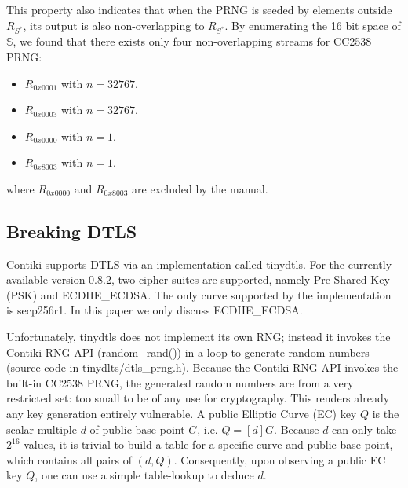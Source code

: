 This property also indicates that when the PRNG is seeded by elements outside $R_{S^*}$, its output is also non-overlapping to $R_{S^*}$. By enumerating the 16 bit space of $\mathbb{S}$, we found that there exists only four non-overlapping streams for CC2538 PRNG:
\begin{itemize}
	\item $R_{0x0001}$ with $n = 32767$.
	\item $R_{0x0003}$ with $n = 32767$.
	\item $R_{0x0000}$ with $n = 1$.
	\item $R_{0x8003}$ with $n = 1$.
\end{itemize}
where $R_{0x0000}$ and $R_{0x8003}$ are excluded by the manual\cite{CC2538Manual}. 

\subsection{Breaking DTLS} \label{BreakDTLS}
Contiki supports DTLS via an implementation called tinydtls\cite{tinydtls}. For the currently available version 0.8.2\cite{tinydtls082},  two cipher suites are supported, namely Pre-Shared Key (PSK)\cite{rfc4279} and ECDHE\_ECDSA\cite{rfc4492}. The only curve supported by the implementation is secp256r1\cite{secp256r1}. In this paper we only discuss ECDHE\_ECDSA. 


Unfortunately, tinydtls does not implement its own RNG; instead it invokes the Contiki RNG API (random\_rand()) in a loop to generate random numbers (source code in tinydlts/dtls\_prng.h). Because the Contiki RNG API invokes the built-in CC2538 PRNG, the generated random numbers are from a very restricted set: too small to be of any use for cryptography. This renders already any key generation entirely vulnerable. A public Elliptic Curve (EC) key $Q$ is the scalar multiple $d$ of public base point $G$, i.e. $Q=[d]G$. Because $d$ can only take $2^{16}$ values, it is trivial to build a table for a specific curve and public base point, which contains all pairs of $(d,Q)$. Consequently, upon observing a public EC key $Q$, one can use a simple table-lookup to deduce $d$.


